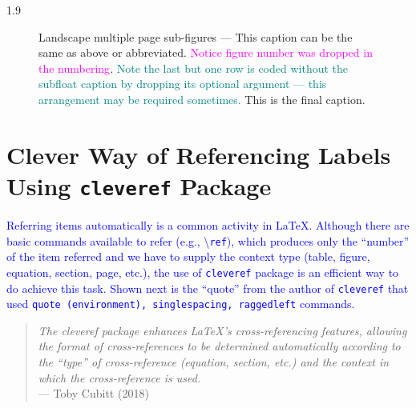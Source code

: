 \documentclass[phd]{ndsu-thesis-2022}
\newcommand\myspacing{1.9} %
\newcommand\italk[1]{\textcolor{blue}{#1}}  %
\newcommand\cmd[1]{\textbackslash\texttt{#1}}  %
\begin{document}
\begin{spacing}{\myspacing}
\begin{landscape}
\begin{figure}[t]
\captionsetup{singlelinecheck=false} %
\caption[]{Landscape multiple page sub-figures --- This caption can be the same as above or abbreviated.  \textcolor{magenta}{Notice figure number was dropped in the numbering}. \textcolor{teal}{Note the last but one row is coded without the subfloat caption by dropping its optional argument --- this arrangement may be required sometimes.} This is the final caption.} 
\end{figure}

\end{landscape}






\section{Clever Way of Referencing Labels Using \texttt{cleveref} Package}
\italk{Referring items automatically is a common activity in \LaTeX. Although there are basic commands available to refer (e.g., \cmd{ref}), which produces only the ``number'' of the item referred and we have to supply the context type (table, figure, equation, section, page, etc.), the use of \texttt{cleveref} package is an efficient way to do achieve this task. Shown next is the ``quote'' from the author of \texttt{cleveref} that used \texttt{quote (environment), singlespacing, raggedleft} commands.}

\vspace{-4ex}
\textcolor{magenta}{
\begin{quote}
\singlespacing
\raggedleft
\textit{The cleveref package enhances \LaTeX's cross-referencing features, allowing the format of cross-references to be determined automatically according to the ``type'' of cross-reference (equation, section, etc.) and the context in which the cross-reference is used.} 
\\\hfill --- Toby Cubitt (2018)
\end{quote}
}


\end{spacing}
\end{document}
